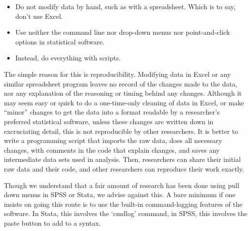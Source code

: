 \documentclass[12pt] {article}
\begin{document}
\begin{itemize}
\item
  Do not modify data by hand, such as with a spreadsheet. Which is to
  say, don't use Excel.
\item
  Use neither the command line nor drop-down menus nor point-and-click
  options in statistical software.
\item
  Instead, do everything with scripts.
\end{itemize}

The simple reason for this is reproducibility. Modifying data in Excel
or any similar spreadsheet program leaves no record of the changes made
to the data, nor any explanation of the reasoning or timing behind any
changes. Although it may seem easy or quick to do a one-time-only
cleaning of data in Excel, or make ``minor'' changes to get the data
into a format readable by a researcher's preferred statistical software,
unless these changes are written down in excruciating detail, this is
not reproducible by other researchers. It is better to write a programming
script that imports the raw data, does all necessary changes, with
comments in the code that explain changes, and saves any intermediate
data sets used in analysis. Then, researchers can share their initial
raw data and their code, and other researchers can reproduce their work
exactly.

Though we understand that a fair amount of research has been done using
pull down menus in SPSS or Stata, we advise against this. A bare minimum
if one insists on going this route is to use the built-in
command-logging features of the software. In Stata, this involves the
`cmdlog' command, in SPSS, this involves the paste button to add to a
syntax.
\end{document}
